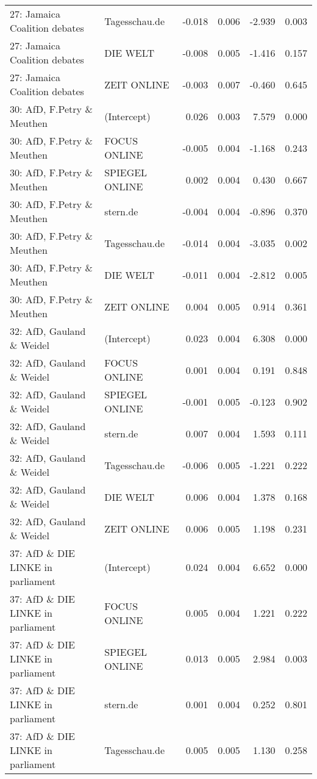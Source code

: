 \begin{adjustbox}{width=\textwidth,totalheight=\textheight,keepaspectratio}
\begin{tabular}{llrrrr}
  27: Jamaica Coalition debates & Tagesschau.de & -0.018 & 0.006 & -2.939 & 0.003 \\ 
  27: Jamaica Coalition debates & DIE WELT & -0.008 & 0.005 & -1.416 & 0.157 \\ 
  27: Jamaica Coalition debates & ZEIT ONLINE & -0.003 & 0.007 & -0.460 & 0.645 \\ 
  30: AfD, F.Petry \& Meuthen & (Intercept) & 0.026 & 0.003 & 7.579 & 0.000 \\ 
  30: AfD, F.Petry \& Meuthen & FOCUS ONLINE & -0.005 & 0.004 & -1.168 & 0.243 \\ 
  30: AfD, F.Petry \& Meuthen & SPIEGEL ONLINE & 0.002 & 0.004 & 0.430 & 0.667 \\ 
  30: AfD, F.Petry \& Meuthen & stern.de & -0.004 & 0.004 & -0.896 & 0.370 \\ 
  30: AfD, F.Petry \& Meuthen & Tagesschau.de & -0.014 & 0.004 & -3.035 & 0.002 \\ 
  30: AfD, F.Petry \& Meuthen & DIE WELT & -0.011 & 0.004 & -2.812 & 0.005 \\ 
  30: AfD, F.Petry \& Meuthen & ZEIT ONLINE & 0.004 & 0.005 & 0.914 & 0.361 \\ 
  32: AfD, Gauland \& Weidel & (Intercept) & 0.023 & 0.004 & 6.308 & 0.000 \\ 
  32: AfD, Gauland \& Weidel & FOCUS ONLINE & 0.001 & 0.004 & 0.191 & 0.848 \\ 
  32: AfD, Gauland \& Weidel & SPIEGEL ONLINE & -0.001 & 0.005 & -0.123 & 0.902 \\ 
  32: AfD, Gauland \& Weidel & stern.de & 0.007 & 0.004 & 1.593 & 0.111 \\ 
  32: AfD, Gauland \& Weidel & Tagesschau.de & -0.006 & 0.005 & -1.221 & 0.222 \\ 
  32: AfD, Gauland \& Weidel & DIE WELT & 0.006 & 0.004 & 1.378 & 0.168 \\ 
  32: AfD, Gauland \& Weidel & ZEIT ONLINE & 0.006 & 0.005 & 1.198 & 0.231 \\ 
  37: AfD \& DIE LINKE in parliament & (Intercept) & 0.024 & 0.004 & 6.652 & 0.000 \\ 
  37: AfD \& DIE LINKE in parliament & FOCUS ONLINE & 0.005 & 0.004 & 1.221 & 0.222 \\ 
  37: AfD \& DIE LINKE in parliament & SPIEGEL ONLINE & 0.013 & 0.005 & 2.984 & 0.003 \\ 
  37: AfD \& DIE LINKE in parliament & stern.de & 0.001 & 0.004 & 0.252 & 0.801 \\ 
  37: AfD \& DIE LINKE in parliament & Tagesschau.de & 0.005 & 0.005 & 1.130 & 0.258 \\ 

\end{tabular}
\end{adjustbox}
